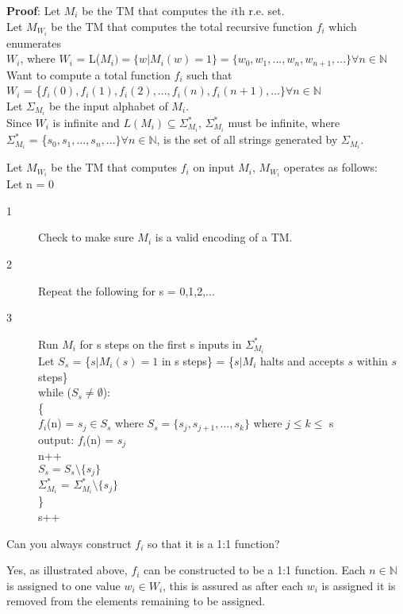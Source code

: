 \documentclass[12pt]{article}
\begin{document}
\begin{enumerate}
\begin{enumerate}
		\textbf{Proof}: Let $M_i$ be the TM that computes the $i$th r.e. set. 
		\\Let $M_{W_{i}}$ be the TM that computes the total recursive function $f_i$ which enumerates 
		\\$W_i$, where 
		$W_i$ = L($M_i) = \{w | M_{i}(w) = 1 \} = \{w_{0}, w_{1}, ..., w_{n}, w_{n+1}, ...\} \forall n \in \mathbb{N}$
		\\Want to compute a total function $f_i$ such that 
		\\$W_i$ = \{$f_{i}(0),f_{i}(1),f_{i}(2), ... , f_{i}(n), f_{i}(n+1), ... \} \forall n \in \mathbb{N}$
		\\Let $\Sigma_{M_{i}}$ be the input alphabet of $M_i$.
		\\Since $W_{i}$ is infinite and $L(M_{i}) \subseteq \Sigma_{M_{i}}^{*}$, $\Sigma_{M_{i}}^{*}$ must be infinite, where
		 \\$\Sigma_{M_{i}}^{*}$ = \{$s_{0}, s_{1}, ..., s_{n}, ...\}  \forall n \in \mathbb{N}$, is the set of all strings generated by $\Sigma_{M_{i}}$.  
		
		Let $M_{W_{i}}$ be the TM that computes $f_{i}$ on input $M_i$, $M_{W_{i}}$ operates as follows:
		\\	Let n = 0
		\begin{description}
			\item[1] Check to make sure $M_i$ is a valid encoding of a TM.
			\item[2] Repeat the following for s = 0,1,2,...
			\item[3] Run $M_{i}$ for s steps on the first s inputs in $\Sigma_{M_{i}}^{*}$
			\\Let $S_{s}$ = \{$s | M_{i}(s) = 1$ in s steps\} = \{$s | M_{i}$ halts and accepts $s$ within $s$ steps\}
			\\while ($S_{s} \neq \emptyset$):
			\\ \{ 	
			\\ $f_{i}$(n) = $s_{j} \in S_{s}$ where $S_{s} =\{s_{j}, s_{j+1}, ... , s_{k}\}$ where $j \leq k \leq$ s
			\\output: $f_{i}$(n) = $s_{j} $
			\\	n++
			\\	$S_{s}=S_{s}\setminus\{s_{j}\}$
			\\	$\Sigma_{M_{i}}^{*}$ = $\Sigma_{M_{i}}^{*} \setminus \{s_{j}\}$
			\\	\}
			\\s++
			
			
		\end{description}
Can you always construct $f_i$ so that it is a 1:1 function?

Yes, as illustrated above, $f_i$ can be constructed to be a 1:1 function. Each  $n \in \mathbb{N}$ is assigned to one value $w_{i} \in W_{i}$, this is assured as after each $w_{i}$ is assigned it is removed from the elements remaining to be assigned. 
  \end{enumerate}

\end{enumerate}
\end{document}
